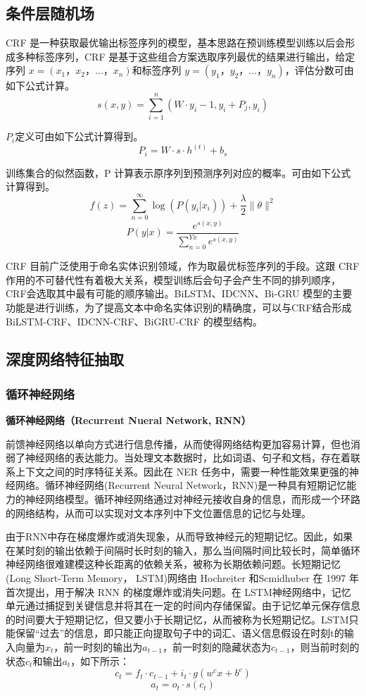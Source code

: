 \documentclass[letterpaper]{article}
\begin{document}
  \subsection{条件层随机场}
  CRF 是一种获取最优输出标签序列的模型，基本思路在预训练模型训练以后会形成多种标签序列，CRF 是基于这些组合方案选取序列最优的结果进行输出，给定序列 $x=(x_1，x_2，…，x_n)$和标签序列 $y=(y_1，y_2，…，y_n)$，评估分数可由如下公式计算。
  $$
  s\left( x,y \right) =\sum_{i=1}^n{\left( W\cdot y_i-1,y_i+P_j,y_i \right)}
  $$

  $P_i$定义可由如下公式计算得到。
  $$
  P_i=W\cdot s\cdot h^{\left( t \right)}+b_s
  $$

  训练集合的似然函数，P 计算表示原序列到预测序列对应的概率。可由如下公式计算得到。
  $$
  f\left( z \right) =\sum_{n=0}^{\infty}{\log \left( P\left( y_i|x_i \right) \right) +\frac{\lambda}{2}\lVert \theta \rVert ^2}
  $$
  $$
  P\left( y|x \right) =\frac{e^{s\left( x,y \right)}}{\sum_{n=0}^{Yx}{e^{s\left( x,y \right)}}}
  $$
  
  CRF 目前广泛使用于命名实体识别领域，作为取最优标签序列的手段。这跟 CRF作用的不可替代性有着极大关系，模型训练后会句子会产生不同的排列顺序，CRF会选取其中最有可能的顺序输出。BiLSTM、IDCNN、Bi-GRU 模型的主要功能是进行训练，为了提高文本中命名实体识别的精确度，可以与CRF结合形成BiLSTM-CRF、IDCNN-CRF、BiGRU-CRF 的模型结构。

  \subsection{深度网络特征抽取}
    \subsubsection{循环神经网络}
    \textbf{循环神经网络（Recurrent Nueral Network, RNN）}
    
    前馈神经网络以单向方式进行信息传播，从而使得网络结构更加容易计算，但也消弱了神经网络的表达能力。当处理文本数据时，比如词语、句子和文档，存在着联系上下文之间的时序特征关系。因此在 NER 任务中，需要一种性能效果更强的神经网络。循环神经网络(Recurrent Neural Network，RNN)是一种具有短期记忆能力的神经网络模型。循环神经网络通过对神经元接收自身的信息，而形成一个环路的网络结构，从而可以实现对文本序列中下文位置信息的记忆与处理。

    由于RNN中存在梯度爆炸或消失现象，从而导致神经元的短期记忆。因此，如果在某时刻的输出依赖于间隔时长时刻的输入，那么当间隔时间比较长时，简单循环神经网络很难建模这种长距离的依赖关系，被称为长期依赖问题。长短期记忆(Long Short-Term Memory， LSTM)网络由 Hochreiter 和Scmidhuber 在 1997 年首次提出，用于解决 RNN 的梯度爆炸或消失问题。在 LSTM神经网络中，记忆单元通过捕捉到关键信息并将其在一定的时间内存储保留。由于记忆单元保存信息的时间要大于短期记忆，但又要小于长期记忆，从而被称为长短期记忆。LSTM只能保留“过去”的信息，即只能正向提取句子中的词汇、语义信息假设在时刻t的输入向量为$x_t$，前一时刻的输出为$a_{t-1}$，前一时刻的隐藏状态为$c_{t-1}$，则当前时刻的状态$c_t$和输出$a_t$，如下所示：
    $$
    c_t=f_t\cdot c_{t-1}+i_t\cdot g\left( w^cx+b^c \right) 
    $$
    $$
    a_t=o_t\cdot s\left( c_t \right) 
    $$
\end{document}
